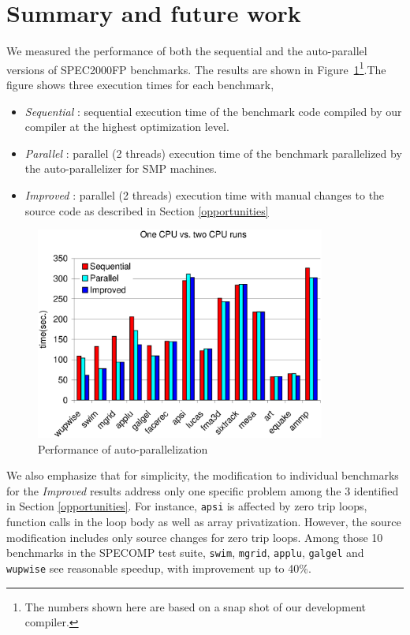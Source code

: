\section{Summary and future work} 
\label{summary}

We measured the performance of both the sequential and the auto-parallel versions of SPEC2000FP benchmarks. The results are shown in Figure~\ref{fig:performance}\footnote{The numbers shown here are based
  on a snap shot of our development compiler.}.The figure shows three execution times for each benchmark,
\begin{itemize}
\item \emph{Sequential} : sequential execution time of the benchmark code compiled by our compiler at the highest
optimization level.
\item \emph{Parallel} : parallel (2 threads) execution time of the benchmark parallelized by the auto-parallelizer for SMP machines.
\item \emph{Improved} : parallel (2 threads) execution time with manual changes to the source code as described in Section \ref{opportunities}
\end{itemize}

\begin{figure}[h!]
  \begin{center}
    \includegraphics[angle=0, width=0.85\textwidth]{spec2kfp.eps}
    \caption{\footnotesize Performance of auto-parallelization}
    \label{fig:performance}
  \end{center}
\end{figure}

We also emphasize that for simplicity, the modification to individual benchmarks for the \emph{Improved} results address only one specific problem among the 3 identified in Section \ref{opportunities}. For instance, \texttt{apsi} 
is affected by zero trip loops, function calls in the loop body as well as array privatization. However, the source modification includes only source changes for zero trip loops. Among those 10 benchmarks in the SPECOMP test suite, \texttt{swim}, \texttt{mgrid}, \texttt{applu}, \texttt{galgel} and \texttt{wupwise}
see reasonable speedup, with improvement up to 40\%.

